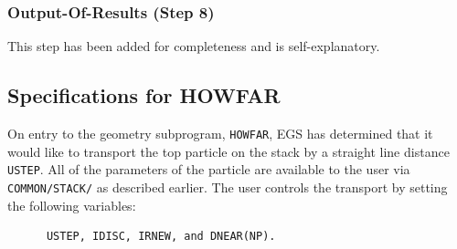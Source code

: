 \subsubsection{Output-Of-Results (Step 8)}
\label{step_8}


This step has been added for completeness and is self-explanatory.


 \subsection{Specifications for HOWFAR}
\label{howfar}


On entry to the geometry subprogram, {\tt HOWFAR}, EGS has determined that it
would like to transport the top particle on the stack by a straight line
distance {\tt USTEP}.  All of the parameters of the particle are available to the
user via {\tt COMMON/STACK/} as described earlier.  The user controls the
transport by setting the following variables:
\begin{verbatim}
      USTEP, IDISC, IRNEW, and DNEAR(NP).
\end{verbatim}

